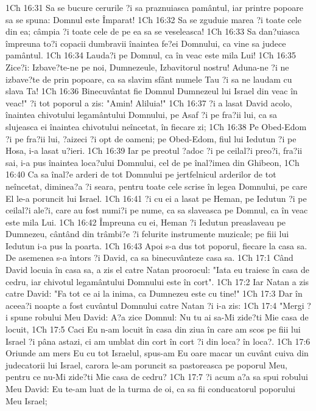 1Ch 16:31  Sa se bucure cerurile ?i sa praznuiasca pamântul, iar printre popoare sa se spuna: Domnul este Împarat!
1Ch 16:32  Sa se zguduie marea ?i toate cele din ea; câmpia ?i toate cele de pe ea sa se veseleasca!
1Ch 16:33  Sa dan?uiasca împreuna to?i copacii dumbravii înaintea fe?ei Domnului, ca vine sa judece pamântul.
1Ch 16:34  Lauda?i pe Domnul, ca în veac este mila Lui!
1Ch 16:35  Zice?i: Izbave?te-ne pe noi, Dumnezeule, Izbavitorul nostru! Aduna-ne ?i ne izbave?te de prin popoare, ca sa slavim sfânt numele Tau ?i sa ne laudam cu slava Ta!
1Ch 16:36  Binecuvântat fie Domnul Dumnezeul lui Israel din veac în veac!" ?i tot poporul a zis: "Amin! Aliluia!"
1Ch 16:37  ?i a lasat David acolo, înaintea chivotului legamântului Domnului, pe Asaf ?i pe fra?ii lui, ca sa slujeasca ei înaintea chivotului neîncetat, în fiecare zi;
1Ch 16:38  Pe Obed-Edom ?i pe fra?ii lui, ?aizeci ?i opt de oameni; pe Obed-Edom, fiul lui Iedutun ?i pe Hosa, i-a lasat u?ieri.
1Ch 16:39  Iar pe preotul ?adoc ?i pe ceilal?i preo?i, fra?ii sai, i-a pus înaintea loca?ului Domnului, cel de pe înal?imea din Ghibeon,
1Ch 16:40  Ca sa înal?e arderi de tot Domnului pe jertfelnicul arderilor de tot neîncetat, diminea?a ?i seara, pentru toate cele scrise în legea Domnului, pe care El le-a poruncit lui Israel.
1Ch 16:41  ?i cu ei a lasat pe Heman, pe Iedutun ?i pe ceilal?i ale?i, care au fost numi?i pe nume, ca sa slaveasca pe Domnul, ca în veac este mila Lui.
1Ch 16:42  Împreuna cu ei, Heman ?i Iedutun preaslaveau pe Dumnezeu, cântând din trâmbi?e ?i felurite instrumente muzicale; pe fiii lui Iedutun i-a pus la poarta.
1Ch 16:43  Apoi s-a dus tot poporul, fiecare la casa sa. De asemenea s-a întors ?i David, ca sa binecuvânteze casa sa.
1Ch 17:1  Când David locuia în casa sa, a zis el catre Natan proorocul: "Iata eu traiesc în casa de cedru, iar chivotul legamântului Domnului este în cort".
1Ch 17:2  Iar Natan a zis catre David: "Fa tot ce ai la inima, ca Dumnezeu este cu tine!"
1Ch 17:3  Dar în aceea?i noapte a fost cuvântul Domnului catre Natan ?i i-a zis:
1Ch 17:4  "Mergi ?i spune robului Meu David: A?a zice Domnul: Nu tu ai sa-Mi zide?ti Mie casa de locuit,
1Ch 17:5  Caci Eu n-am locuit în casa din ziua în care am scos pe fiii lui Israel ?i pâna astazi, ci am umblat din cort în cort ?i din loca? în loca?.
1Ch 17:6  Oriunde am mers Eu cu tot Israelul, spus-am Eu oare macar un cuvânt cuiva din judecatorii lui Israel, carora le-am poruncit sa pastoreasca pe poporul Meu, pentru ce nu-Mi zide?ti Mie casa de cedru?
1Ch 17:7  ?i acum a?a sa spui robului Meu David: Eu te-am luat de la turma de oi, ca sa fii conducatorul poporului Meu Israel;
